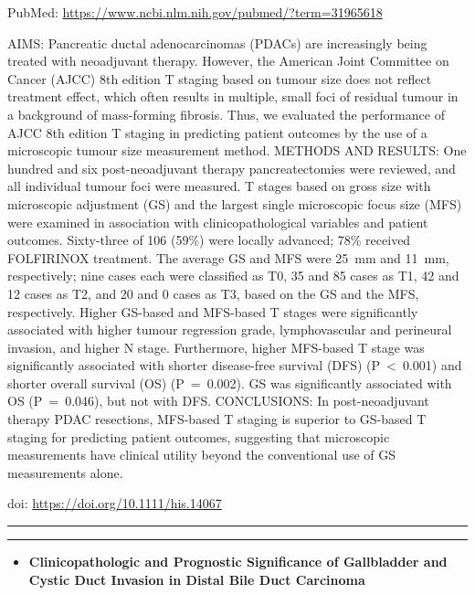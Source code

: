 \documentclass[
]{article}
\providecommand{\tightlist}{%
  \setlength{\itemsep}{0pt}\setlength{\parskip}{0pt}}
\begin{document}
PubMed: \url{https://www.ncbi.nlm.nih.gov/pubmed/?term=31965618}

AIMS: Pancreatic ductal adenocarcinomas (PDACs) are increasingly being
treated with neoadjuvant therapy. However, the American Joint Committee
on Cancer (AJCC) 8th edition T staging based on tumour size does not
reflect treatment effect, which often results in multiple, small foci of
residual tumour in a background of mass-forming fibrosis. Thus, we
evaluated the performance of AJCC 8th edition T staging in predicting
patient outcomes by the use of a microscopic tumour size measurement
method. METHODS AND RESULTS: One hundred and six post-neoadjuvant
therapy pancreatectomies were reviewed, and all individual tumour foci
were measured. T stages based on gross size with microscopic adjustment
(GS) and the largest single microscopic focus size (MFS) were examined
in association with clinicopathological variables and patient outcomes.
Sixty-three of 106 (59\%) were locally advanced; 78\% received
FOLFIRINOX treatment. The average GS and MFS were 25~mm and 11~mm,
respectively; nine cases each were classified as T0, 35 and 85 cases as
T1, 42 and 12 cases as T2, and 20 and 0 cases as T3, based on the GS and
the MFS, respectively. Higher GS-based and MFS-based T stages were
significantly associated with higher tumour regression grade,
lymphovascular and perineural invasion, and higher N stage. Furthermore,
higher MFS-based T stage was significantly associated with shorter
disease-free survival (DFS) (P~\textless~0.001) and shorter overall
survival (OS) (P~=~0.002). GS was significantly associated with OS
(P~=~0.046), but not with DFS. CONCLUSIONS: In post-neoadjuvant therapy
PDAC resections, MFS-based T staging is superior to GS-based T staging
for predicting patient outcomes, suggesting that microscopic
measurements have clinical utility beyond the conventional use of GS
measurements alone.

doi: \url{https://doi.org/10.1111/his.14067}

\begin{center}\rule{0.5\linewidth}{0.5pt}\end{center}

\begin{center}\rule{0.5\linewidth}{0.5pt}\end{center}

\begin{itemize}
\tightlist
\item
  \textbf{Clinicopathologic and Prognostic Significance of Gallbladder
  and Cystic Duct Invasion in Distal Bile Duct Carcinoma}
\end{itemize}
\end{document}
